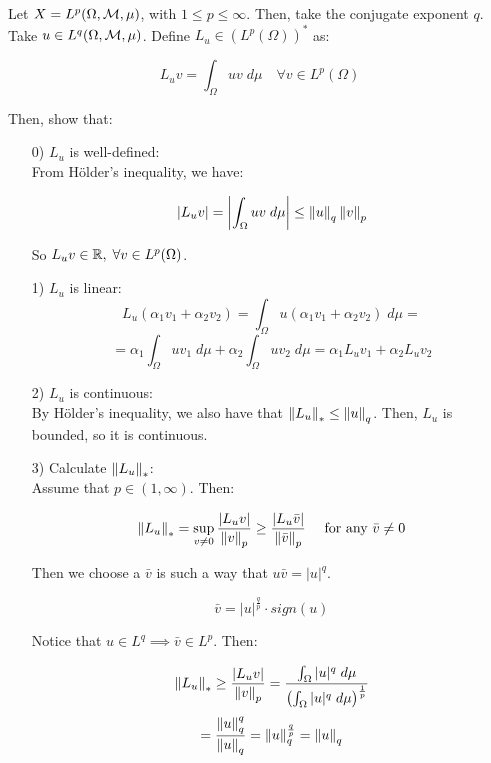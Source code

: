 \begin{fexample}
    Let $X = L^p(\Omega, \mathcal{M}, \mu)$, with $1 \leq p \leq \infty$. Then,
    take the conjugate exponent $q$. Take $u \in L^q(\Omega, \mathcal{M}, \mu)$.
    Define $L_u \in (L^p(\Omega))^*$ as:

    $$L_u v = \int_{\Omega} uv \; d\mu \quad \forall v \in L^p(\Omega)$$

    Then, show that:
    \vspace{1em}
    \begin{enumerate}
        \item[0)] $L_u$ is well-defined:\\
        From Hölder's inequality, we have:

        $$|L_u v| = \left| \int_{\Omega} uv \; d\mu \right| \leq \left\|u\right\|_q \left\|v\right\|_p$$

        So $L_u v \in \mathbb{R}, \; \forall v \in L^p(\Omega)$. 
        \vspace{1em}

        \item[1)] $L_u$ is linear:
        $$L_u(\alpha_1 v_1 + \alpha_2 v_2) = \int_{\Omega} u(\alpha_1 v_1 + \alpha_2 v_2) \; d\mu =$$
        $$=\alpha_1 \int_{\Omega} u v_1 \; d\mu + \alpha_2 \int_{\Omega} u v_2 \; d\mu = \alpha_1 L_u v_1 + \alpha_2 L_u v_2$$
        \vspace{1em}

        \item[2)] $L_u$ is continuous:\\
        By Hölder's inequality, we also have that $\left\|L_u\right\|_* \leq \left\|u\right\|_q$.
        Then, $L_u$ is bounded, so it is continuous.
        \vspace{1em}

        \item[3)] Calculate $\left\|L_u\right\|_*$:\\
        Assume that $p \in (1, \infty)$. Then:

        $$\left\|L_u\right\|_* = \sup_{v \neq 0} \frac{|L_u v|}{\left\|v\right\|_p} \geq \frac{|L_u \bar{v}|}{\left\|\bar{v}\right\|_p} \quad \text{ for any } \bar{v} \neq 0$$

        Then we choose a $\bar{v}$ is such a way that $u \bar{v} = |u|^q$.

        $$\bar{v} = |u|^{\frac{q}{p}} \cdot sign(u)$$

        Notice that $u \in L^q \implies \bar{v} \in L^p$. Then:

        $$\left\|L_u\right\|_* \geq \frac{|L_u v|}{\left\|v\right\|_p} = \frac{\int_{\Omega} |u|^q \; d\mu}{\left( \int_{\Omega} |u|^q \; d\mu \right)^{\frac{1}{p}}}$$
        $$= \frac{\left\|u\right\|_q^q}{\left\|u\right\|_q} = \left\|u\right\|_q^{\frac{q}{p}} = \left\|u\right\|_q$$


\end{enumerate}
\end{fexample}
